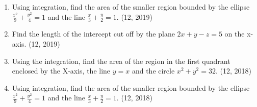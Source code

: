 \begin{enumerate}[label=\thesubsection.\arabic*,ref=\thesubsection.\theenumi]
\item Using integration, find the area of the smaller region bounded by the ellipse $\frac{x^{2}}{9}+\frac{y^{2}}{4}=1$ and the line $\frac{x}{3}+\frac{y}{2}=1$. \hfill (12, 2019)
\item Find the length of the intercept cut off by the plane $2x+y-z=5$ on the x-axis. \hfill (12, 2019)
\item Using the integration, find the area of the region in the first quadrant enclosed by the X-axis, the line $y=x$ and the circle $x^{2}+y^{2}=32$. \hfill (12, 2018)
\item Using integration, find the area of the smaller region bounded by the ellipse $\frac{x^{2}}{9}+\frac{y^{2}}{4}=1$ and the line $\frac{x}{3}+\frac{y}{2}=1$. \hfill (12, 2018)
\end{enumerate}

